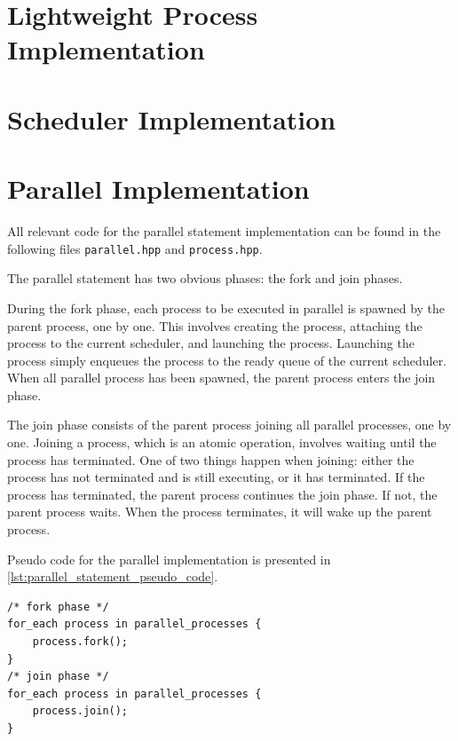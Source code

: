 \section{Lightweight Process Implementation}


\section{Scheduler Implementation}

\FloatBarrier
\section{Parallel Implementation}
\label{sec:parallel_implementation}

All relevant code for the parallel statement implementation can be found in the following files \texttt{parallel.hpp} and \texttt{process.hpp}.

The parallel statement has two obvious phases: the fork and join phases. 

During the fork phase, each process to be executed in parallel is spawned by the parent process, one by one. This involves creating the process, attaching the process to the current scheduler, and launching the process. Launching the process simply enqueues the process to the ready queue of the current scheduler. When all parallel process has been spawned, the parent process enters the join phase.

The join phase consists of the parent process joining all parallel processes, one by one. Joining a process, which is an atomic operation, involves waiting until the process has terminated. One of two things happen when joining: either the process has not terminated and is still executing, or it has terminated. If the process has terminated, the parent process continues the join phase. If not, the parent process waits. When the process terminates, it will wake up the parent process.

Pseudo code for the parallel implementation is presented in \cref{lst:parallel_statement_pseudo_code}.

\begin{lstfloat}
\begin{lstlisting}[caption={Parallel statement pseudo code.}, label={lst:parallel_statement_pseudo_code}, style={CustomC++}, xleftmargin={4em}]
/* fork phase */
for_each process in parallel_processes {
    process.fork();
}
/* join phase */
for_each process in parallel_processes {
    process.join();
}
\end{lstlisting}
\end{lstfloat}

